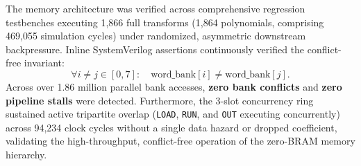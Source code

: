 The memory architecture was verified across comprehensive regression testbenches executing 1,866 full transforms (1,864 polynomials, comprising 469,055 simulation cycles) under randomized, asymmetric downstream backpressure. Inline SystemVerilog assertions continuously verified the conflict-free invariant:
\begin{equation}
\label{eq:assertion_invariant}
\forall i \neq j \in [0, 7]: \quad \text{word\_bank}[i] \neq \text{word\_bank}[j].
\end{equation}
Across over 1.86 million parallel bank accesses, \textbf{zero bank conflicts} and \textbf{zero pipeline stalls} were detected. Furthermore, the 3-slot concurrency ring sustained active tripartite overlap (\texttt{LOAD}, \texttt{RUN}, and \texttt{OUT} executing concurrently) across 94,234 clock cycles without a single data hazard or dropped coefficient, validating the high-throughput, conflict-free operation of the zero-BRAM memory hierarchy.
